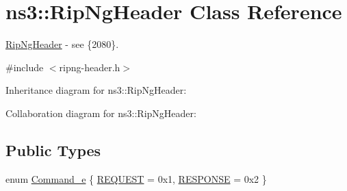 \hypertarget{classns3_1_1RipNgHeader}{}\section{ns3\+:\+:Rip\+Ng\+Header Class Reference}
\label{classns3_1_1RipNgHeader}


\hyperlink{classns3_1_1RipNgHeader}{Rip\+Ng\+Header} -\/ see \{2080\}.  




{\ttfamily \#include $<$ripng-\/header.\+h$>$}



Inheritance diagram for ns3\+:\+:Rip\+Ng\+Header\+:


Collaboration diagram for ns3\+:\+:Rip\+Ng\+Header\+:
\subsection*{Public Types}
\begin{DoxyCompactItemize}
\item 
enum \hyperlink{classns3_1_1RipNgHeader_ad96724d6f6fdb4ffa22fe71a0ff12bd2}{Command\+\_\+e} \{ \hyperlink{classns3_1_1RipNgHeader_ad96724d6f6fdb4ffa22fe71a0ff12bd2a5ad5fca80e45262ccf65fa6f0839984e}{R\+E\+Q\+U\+E\+ST} = 0x1, 
\hyperlink{classns3_1_1RipNgHeader_ad96724d6f6fdb4ffa22fe71a0ff12bd2a787536902c0e1912fd0c234def4c32b7}{R\+E\+S\+P\+O\+N\+SE} = 0x2
 \}
\end{DoxyCompactItemize}

